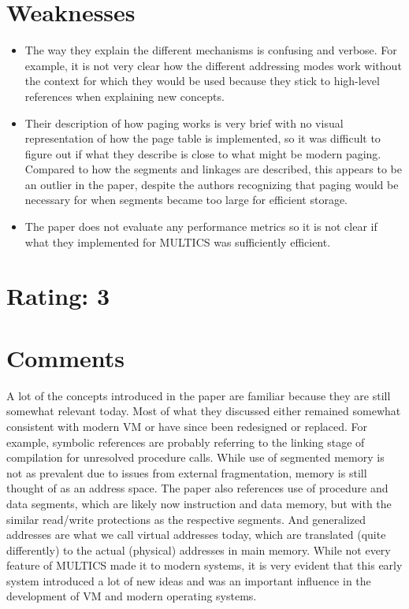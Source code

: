 \documentclass [12pt]{article}
\begin{document}
    \section{Weaknesses} %
    \label{sec:weaknesses}
        \begin{itemize}
            \item The way they explain the different mechanisms is confusing and verbose. For example, it is not very clear how the different addressing modes work without the context for which they would be used because they stick to high-level references when explaining new concepts. 
            \item Their description of how paging works is very brief with no visual representation of how the page table is implemented, so it was difficult to figure out if what they describe is close to what might be modern paging. Compared to how the segments and linkages are described, this appears to be an outlier in the paper, despite the authors recognizing that paging would be necessary for when segments became too large for efficient storage. 
            \item The paper does not evaluate any performance metrics so it is not clear if what they implemented for MULTICS was sufficiently efficient. 
        \end{itemize}

    \section{Rating: 3} %
    \label{sec:rating}
    \pagebreak

    \section{Comments} %
    \label{sec:comments}

    A lot of the concepts introduced in the paper are familiar because they are still somewhat relevant today. Most of what they discussed either remained somewhat consistent with modern VM or have since been redesigned or replaced. For example, symbolic references are probably referring to the linking stage of compilation for unresolved procedure calls. While use of segmented memory is not as prevalent due to issues from external fragmentation, memory is still thought of as an address space. The paper also references use of procedure and data segments, which are likely now instruction and data memory, but with the similar read/write protections as the respective segments. And generalized addresses are what we call virtual addresses today, which are translated (quite differently) to the actual (physical) addresses in main memory. While not every feature of MULTICS made it to modern systems, it is very evident that this early system introduced a lot of new ideas and was an important influence in the development of VM and modern operating systems.
    
\end{document}
